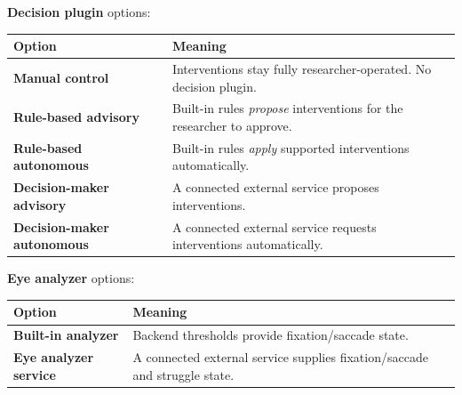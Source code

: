 \textbf{Decision plugin} options:

{\small{} %
\begin{longtable}[]{@{}
  >{\raggedright\arraybackslash}p{}
  >{\raggedright\arraybackslash}p{}@{}}
\toprule\noalign{}
\begin{minipage}[b]{\linewidth}\raggedright
Option
\end{minipage} & \begin{minipage}[b]{\linewidth}\raggedright
Meaning
\end{minipage} \\
\midrule\noalign{}
\endhead
\bottomrule\noalign{}
\endlastfoot
\textbf{Manual control} & Interventions stay fully researcher-operated. No decision plugin. \\
\textbf{Rule-based advisory} & Built-in rules \emph{propose} interventions for the researcher to approve. \\
\textbf{Rule-based autonomous} & Built-in rules \emph{apply} supported interventions automatically. \\
\textbf{Decision-maker advisory} & A connected external service proposes interventions. \\
\textbf{Decision-maker autonomous} & A connected external service requests interventions automatically. \\
\end{longtable}
}

\textbf{Eye analyzer} options:

{\small{} %
\begin{longtable}[]{@{}
  >{\raggedright\arraybackslash}p{}
  >{\raggedright\arraybackslash}p{}@{}}
\toprule\noalign{}
\begin{minipage}[b]{\linewidth}\raggedright
Option
\end{minipage} & \begin{minipage}[b]{\linewidth}\raggedright
Meaning
\end{minipage} \\
\midrule\noalign{}
\endhead
\bottomrule\noalign{}
\endlastfoot
\textbf{Built-in analyzer} & Backend thresholds provide fixation/saccade state. \\
\textbf{Eye analyzer service} & A connected external service supplies fixation/saccade and struggle state. \\
\end{longtable}
}


